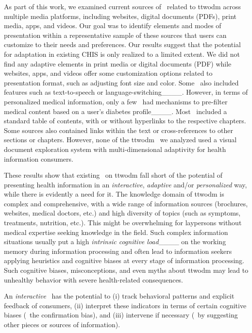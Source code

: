 As part of this work, we examined current sources of \chis\ related to \acrshort{ttwodm} across multiple media platforms, including websites, digital documents (PDFs), print media, apps, and videos. Our goal was to identify elements and modes of presentation within a representative sample of these sources that users can customize to their needs and preferences.
%
Our results suggest that the potential for adaptation in existing CHIS is only realized to a limited extent.
%
We did not find any adaptive elements in print media or digital documents (PDF) while websites, apps, and videos offer some customization options related to presentation format, such as adjusting font size and color. 
%
Some \chis\ also included features such as text-to-speech or language-switching____.
%
However, in terms of personalized medical information, only a few \chis\ had mechanisms to pre-filter medical content based on a user's diabetes profile____.
%
Most \chis\ included a standard table of contents, with or without hyperlinks to the respective chapters. Some sources also contained links within the text or cross-references to other sections or chapters. 
%
However, none of the \acrshort{ttwodm} \chis\ we analyzed used a visual document exploration system with multi-dimensional adaptivity for health information consumers.



These results show that existing \chis\ on \acrshort{ttwodm} fall short of the potential of presenting health information in an \emph{interactive}, \emph{adaptive} and/or \emph{personalized} way, while there is evidently a need for it. 
%
The knowledge domain of \acrshort{ttwodm} is complex and comprehensive, with a wide range of information sources (brochures, websites, medical doctors, etc.) and high diversity of topics (such as symptoms, treatments, nutrition, etc.). 
%
This might be overwhelming for laypersons without medical expertise seeking knowledge in the field. Such complex information situations usually put a high \emph{intrinsic cognitive load}____ on the working memory during information processing and often lead to information seekers applying heuristics and cognitive biases at every stage of information processing. 
%
Such cognitive biases, misconceptions, and even myths about \acrshort{ttwodm} may lead to unhealthy behavior with severe health-related consequences. 


An \emph{interactive} \chis\ has the potential to (i) track behavioral patterns and explicit feedback of consumers, (ii) interpret these indicators in terms of certain cognitive biases (\eg\ the confirmation bias), and (iii) intervene if necessary (\eg\ by suggesting other pieces or sources of information). 

